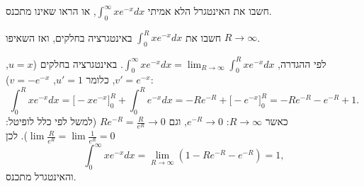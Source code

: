 
\begin{question}
חשבו את האינטגרל הלא אמיתי $\int_0^\infty xe^{-x}dx$, או הראו שאינו מתכנס.
\end{question}

\begin{hint}
חשבו את $\int_0^R xe^{-x}dx$ באינטגרציה בחלקים, ואז השאיפו $R\to\infty$.
\end{hint}

\begin{solution}
לפי ההגדרה, $\int_0^\infty xe^{-x}dx=\lim_{R\to\infty}\int_0^R xe^{-x}dx$.
באינטגרציה בחלקים ($u=x$, $v'=e^{-x}$, כלומר $u'=1$, $v=-e^{-x}$):
\[ \int_0^R xe^{-x}dx=\Big[-xe^{-x}\Big]_0^R+\int_0^R e^{-x}dx=-Re^{-R}+\Big[-e^{-x}\Big]_0^R=-Re^{-R}-e^{-R}+1. \]
כאשר $R\to\infty$: $e^{-R}\to0$, וגם $Re^{-R}=\frac{R}{e^R}\to0$ (למשל לפי כלל לופיטל: $\lim\frac{R}{e^R}=\lim\frac1{e^R}=0$). לכן
\[ \int_0^\infty xe^{-x}dx=\lim_{R\to\infty}\left(1-Re^{-R}-e^{-R}\right)=\boxed{1}, \]
והאינטגרל מתכנס.
\end{solution}
